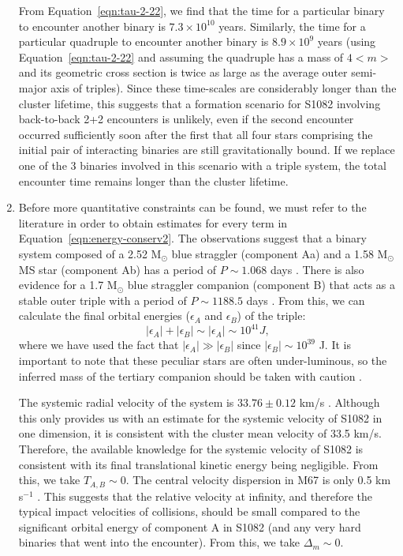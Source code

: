 \begin{enumerate}
From Equation~\ref{eqn:tau-2-22}, we find that the time for a particular
binary to encounter another binary is $7.3 \times 10^{10}$ years.
Similarly, the time for a particular quadruple to encounter another
binary is $8.9 \times 10^9$ years (using Equation~\ref{eqn:tau-2-22}
and assuming the quadruple has a mass
of $4<m>$ and its geometric cross section is twice as large as the
average outer semi-major axis of triples).  Since these time-scales
are considerably longer than the
cluster lifetime, this suggests that a formation scenario for S1082
involving back-to-back 2+2 encounters is unlikely, even if the second
encounter occurred sufficiently soon after the first that all four
stars comprising the initial pair of interacting binaries are still
gravitationally bound.  If we replace one of the 3 binaries involved
in this scenario with a triple system, the total encounter time
remains longer than the cluster lifetime.  

\item Before more quantitative constraints can be found, we
  must refer to the literature in order to obtain estimates 
for every term in Equation~\ref{eqn:energy-conserv2}.  The
observations suggest that a binary system composed of a 2.52
M$_{\odot}$ blue straggler (component 
Aa) and a 1.58 M$_{\odot}$ MS star (component Ab) has a period of $P
\sim 1.068$ days \citep{vandenberg01}.  There is also evidence for a
1.7 M$_{\odot}$
blue straggler companion (component B) that acts as a stable outer
triple with a period of $P \sim 1188.5$ days \citep{sandquist03}.
From this, we can calculate the final orbital energies ($\epsilon_A$
and $\epsilon_B$) of the triple:
\begin{equation}
\label{eqn:orb-f}
|\epsilon_A| + |\epsilon_B| \sim |\epsilon_A| \sim 10^{41} J,
\end{equation}
where we have used the fact that $|\epsilon_A| \gg |\epsilon_B|$ since
$|\epsilon_B| \sim 10^{39}$ J.  
It is important to note that these peculiar stars are often
under-luminous, so the inferred mass of the tertiary companion should
be taken with caution \citep{vandenberg01}.  

The systemic radial velocity of the system is $33.76 \pm 0.12$ km/s
\citep{sandquist03}.  Although this only provides us with an estimate
for the systemic velocity of S1082 in one dimension, it is consistent
with the cluster mean 
velocity of 33.5 km/s.  Therefore, the available knowledge for the
systemic velocity of S1082 is consistent with its final
translational kinetic energy being negligible.  From this, we take
$T_{A,B} \sim 0$.  The central 
velocity dispersion in M67 is only 0.5 km s$^{-1}$ \citep{mathieu86,
  mathieu90}.  This suggests that the relative velocity at infinity, 
and therefore the typical impact velocities of collisions, should be
small compared to the significant orbital energy of component A in
S1082 (and any very hard binaries that went into the encounter).  From
this, we take $\Delta_m \sim 0$.


\end{enumerate}
